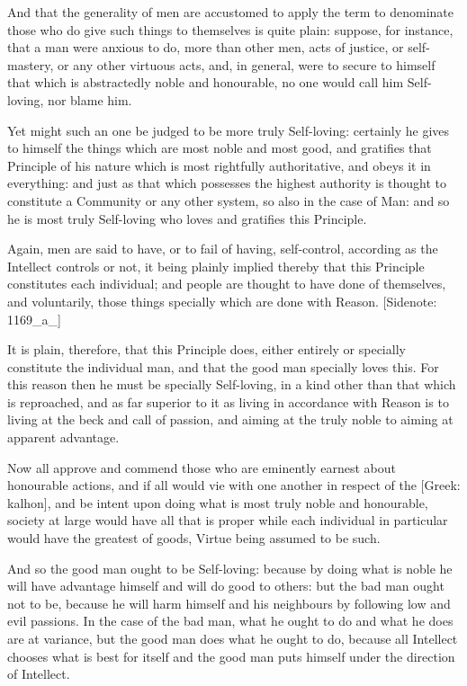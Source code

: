 And that the generality of men are accustomed to apply the term to
denominate those who do give such things to themselves is quite plain:
suppose, for instance, that a man were anxious to do, more than other
men, acts of justice, or self-mastery, or any other virtuous acts, and,
in general, were to secure to himself that which is abstractedly noble
and honourable, no one would call him Self-loving, nor blame him.

Yet might such an one be judged to be more truly Self-loving: certainly
he gives to himself the things which are most noble and most good,
and gratifies that Principle of his nature which is most rightfully
authoritative, and obeys it in everything: and just as that which
possesses the highest authority is thought to constitute a Community or
any other system, so also in the case of Man: and so he is most truly
Self-loving who loves and gratifies this Principle.

Again, men are said to have, or to fail of having, self-control,
according as the Intellect controls or not, it being plainly implied
thereby that this Principle constitutes each individual; and people are
thought to have done of themselves, and voluntarily, those things
specially which are done with Reason. [Sidenote: 1169_a_]

It is plain, therefore, that this Principle does, either entirely or
specially constitute the individual man, and that the good man specially
loves this. For this reason then he must be specially Self-loving, in a
kind other than that which is reproached, and as far superior to it as
living in accordance with Reason is to living at the beck and call of
passion, and aiming at the truly noble to aiming at apparent advantage.

Now all approve and commend those who are eminently earnest about
honourable actions, and if all would vie with one another in respect of
the [Greek: kalhon], and be intent upon doing what is most truly noble
and honourable, society at large would have all that is proper while
each individual in particular would have the greatest of goods, Virtue
being assumed to be such.

And so the good man ought to be Self-loving: because by doing what is
noble he will have advantage himself and will do good to others: but the
bad man ought not to be, because he will harm himself and his neighbours
by following low and evil passions. In the case of the bad man, what he
ought to do and what he does are at variance, but the good man does what
he ought to do, because all Intellect chooses what is best for itself
and the good man puts himself under the direction of Intellect.

